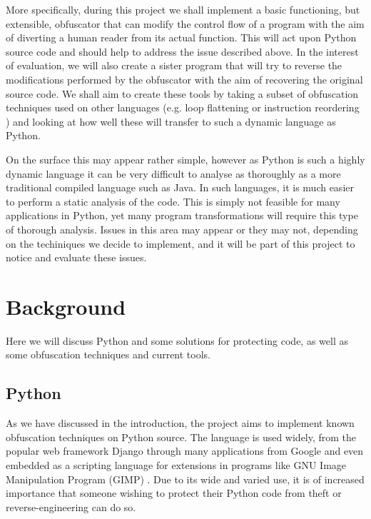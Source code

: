 \documentclass{report}
\begin{document}
More specifically, during this project we shall implement a basic functioning, but extensible, obfuscator
that can modify the control flow of a program with the aim of diverting a human reader from its actual
function. This will act upon Python source code and should help to address the issue described above.
In the interest of evaluation, we will also create a sister program that will try to reverse the modifications performed by the
obfuscator with the aim of recovering the original source code. 
We shall aim to create these tools by taking a subset of obfuscation techniques used on other languages (e.g.
loop flattening or instruction reordering \cite{taxobftrans}) and looking at how well these will transfer to such a dynamic language as Python.

On the surface this may appear rather simple, however as Python is such a highly dynamic language it can be very difficult to analyse
\cite[p13]{staticanal} as thoroughly as a more traditional compiled language such as Java. In such languages, it is much easier to perform a static
analysis of the code. This is simply not feasible for many applications in Python, yet many program transformations will require this type of
thorough analysis. Issues in this area may appear or they may not, depending on the techiniques we decide to implement, and it will be part of
this project to notice and evaluate these issues.

\section{Background}

Here we will discuss Python and some solutions for protecting code, as well as some obfuscation techniques
and current tools.

\subsection{Python}

As we have discussed in the introduction, the project aims to implement known obfuscation techniques on Python source.
The language is used widely, from the popular web framework Django \cite{django} through many applications
from Google \cite{pygoogle} and even embedded as a scripting language for extensions in programs like GNU
Image Manipulation Program (GIMP) \cite{gimp}. Due to its wide and varied use, it is of increased importance
that someone wishing to protect their Python code from theft or reverse-engineering can do so.
\end{document}
